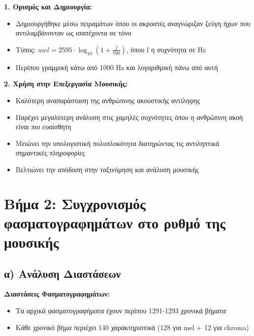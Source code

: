 \documentclass[a4paper,12pt]{article}
\begin{document}
\textbf{1. Ορισμός και Δημιουργία:}
\begin{itemize}
    \item Δημιουργήθηκε μέσω πειραμάτων όπου οι ακροατές αναγνώριζαν ζεύγη ήχων που αντιλαμβάνονταν ως ισαπέχοντα σε τόνο
    \item Τύπος: $mel = 2595 \cdot \log_{10}(1 + \frac{f}{700})$, όπου f η συχνότητα σε Hz
    \item Περίπου γραμμική κάτω από 1000 Hz και λογαριθμική πάνω από αυτή
\end{itemize}

\textbf{2. Χρήση στην Επεξεργασία Μουσικής:}
\begin{itemize}
    \item Καλύτερη αναπαράσταση της ανθρώπινης ακουστικής αντίληψης
    \item Παρέχει μεγαλύτερη ανάλυση στις χαμηλές συχνότητες όπου η ανθρώπινη ακοή είναι πιο ευαίσθητη
    \item Μειώνει την υπολογιστική πολυπλοκότητα διατηρώντας τις αντιληπτικά σημαντικές πληροφορίες
    \item Βελτιώνει την απόδοση στην ταξινόμηση και ανάλυση μουσικής
\end{itemize}

\section*{Βήμα 2: Συγχρονισμός φασματογραφημάτων στο ρυθμό της μουσικής}

\subsection*{α) Ανάλυση Διαστάσεων}

\textbf{Διαστάσεις Φασματογραφημάτων:}
\begin{itemize}
   \item Τα αρχικά φασματογραφήματα έχουν περίπου 1291-1293 χρονικά βήματα
   \item Κάθε χρονικό βήμα περιέχει 140 χαρακτηριστικά (128 για mel + 12 για chroma)
\end{itemize}
\end{document}
